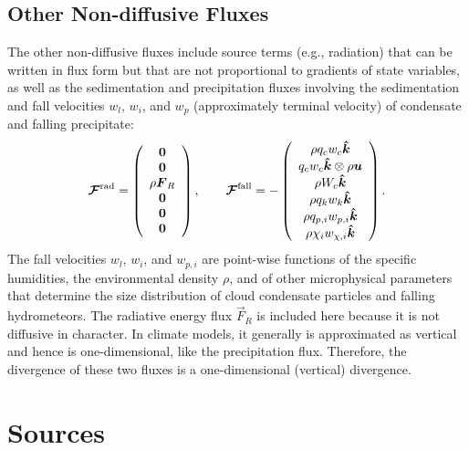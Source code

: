 \documentclass{report}
\begin{document}
\subsection{Other Non-diffusive Fluxes}

The other non-diffusive fluxes include source terms (e.g., radiation) that can be written in flux form but that are not proportional to gradients of state variables, as well as the sedimentation and precipitation fluxes involving the sedimentation and fall velocities $w_l$, $w_i$, and $w_p$ (approximately terminal velocity) of condensate and falling precipitate:
\begin{equation}
\boldsymbol{{\mathcal{F}}}^{\mathrm{rad}} = 
\left( \begin{array}{c}
\boldsymbol{{0}} \\
\boldsymbol{{0}} \\
\rho \boldsymbol{{F}}_R \\
\boldsymbol{{0}} \\
\boldsymbol{{0}} \\
\boldsymbol{{0}} 
\end{array}
\right), \qquad
\boldsymbol{{\mathcal{F}}}^{\mathrm{fall}} = 
- \left( \begin{array}{c}
\rho q_{c} w_{c} \boldsymbol{{\hat k}}  \\
q_c w_c \boldsymbol{{\hat k}} \otimes \rho \boldsymbol{{u}}  \\
\rho W_c \boldsymbol{{\hat k}} \\
\rho q_{k} w_{k} \boldsymbol{{\hat k}}  \\
\rho q_{p,i} w_{p, i} \boldsymbol{{\hat k}} \\
\rho \chi_{i} w_{\chi, i} \boldsymbol{{\hat k}} 
\end{array}
\right).
\label{eq:ndf_flux}
\end{equation}
The fall velocities $w_l$, $w_i$, and $w_{p, i}$ are point-wise functions of the specific humidities, the environmental density $\rho$, and of other microphysical parameters that determine the size distribution of cloud condensate particles and falling hydrometeors. The radiative energy flux $\vec{F}_R$ is included here because it is not diffusive in character. In climate models, it generally is approximated as vertical and hence is one-dimensional, like the precipitation flux. Therefore, the divergence of these two fluxes is a one-dimensional (vertical) divergence. 

\section{Sources}
\end{document}
